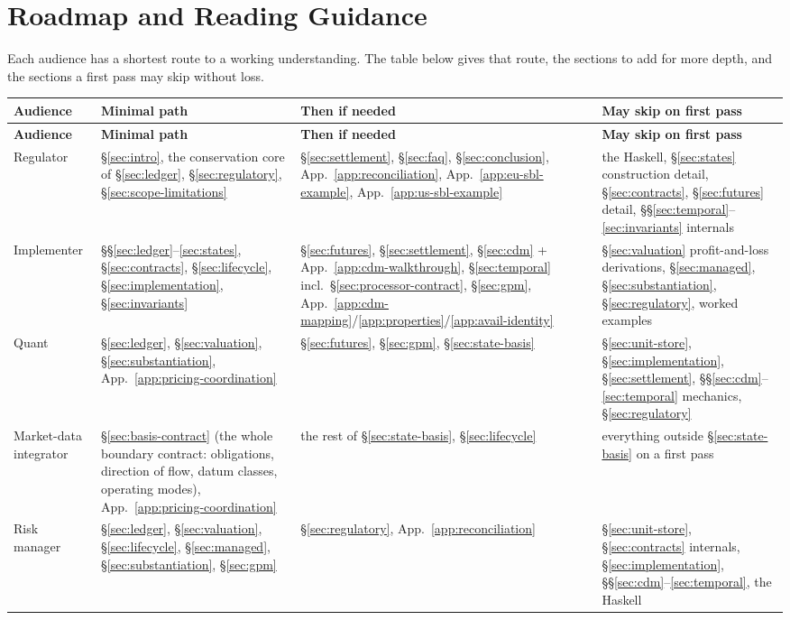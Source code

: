 \section*{Roadmap and Reading Guidance}

Each audience has a shortest route to a working understanding. The table below gives
that route, the sections to add for more depth, and the sections a first pass may skip
without loss.

\begin{longtable}{@{}p{}p{}p{}p{}@{}}
\toprule
\textbf{Audience} & \textbf{Minimal path} & \textbf{Then if needed} & \textbf{May skip on first pass} \\
\midrule
\endfirsthead
\toprule
\textbf{Audience} & \textbf{Minimal path} & \textbf{Then if needed} & \textbf{May skip on first pass} \\
\midrule
\endhead
\bottomrule
\endfoot
Regulator &
\S\ref{sec:intro}, the conservation core of \S\ref{sec:ledger}, \S\ref{sec:regulatory}, \S\ref{sec:scope-limitations} &
\S\ref{sec:settlement}, \S\ref{sec:faq}, \S\ref{sec:conclusion}, App.~\ref{app:reconciliation}, App.~\ref{app:eu-sbl-example}, App.~\ref{app:us-sbl-example} &
the Haskell, \S\ref{sec:states} construction detail, \S\ref{sec:contracts}, \S\ref{sec:futures} detail, \S\S\ref{sec:temporal}--\ref{sec:invariants} internals \\
\addlinespace
Implementer &
\S\S\ref{sec:ledger}--\ref{sec:states}, \S\ref{sec:contracts}, \S\ref{sec:lifecycle}, \S\ref{sec:implementation}, \S\ref{sec:invariants} &
\S\ref{sec:futures}, \S\ref{sec:settlement}, \S\ref{sec:cdm} + App.~\ref{app:cdm-walkthrough}, \S\ref{sec:temporal} incl.\ \S\ref{sec:processor-contract}, \S\ref{sec:gpm}, App.~\ref{app:cdm-mapping}/\ref{app:properties}/\ref{app:avail-identity} &
\S\ref{sec:valuation} profit-and-loss derivations, \S\ref{sec:managed}, \S\ref{sec:substantiation}, \S\ref{sec:regulatory}, worked examples \\
\addlinespace
Quant &
\S\ref{sec:ledger}, \S\ref{sec:valuation}, \S\ref{sec:substantiation}, App.~\ref{app:pricing-coordination} &
\S\ref{sec:futures}, \S\ref{sec:gpm}, \S\ref{sec:state-basis} &
\S\ref{sec:unit-store}, \S\ref{sec:implementation}, \S\ref{sec:settlement}, \S\S\ref{sec:cdm}--\ref{sec:temporal} mechanics, \S\ref{sec:regulatory} \\
\addlinespace
Market-data integrator &
\S\ref{sec:basis-contract} (the whole boundary contract: obligations, direction of flow, datum classes, operating modes), App.~\ref{app:pricing-coordination} &
the rest of \S\ref{sec:state-basis}, \S\ref{sec:lifecycle} &
everything outside \S\ref{sec:state-basis} on a first pass \\
\addlinespace
Risk manager &
\S\ref{sec:ledger}, \S\ref{sec:valuation}, \S\ref{sec:lifecycle}, \S\ref{sec:managed}, \S\ref{sec:substantiation}, \S\ref{sec:gpm} &
\S\ref{sec:regulatory}, App.~\ref{app:reconciliation} &
\S\ref{sec:unit-store}, \S\ref{sec:contracts} internals, \S\ref{sec:implementation}, \S\S\ref{sec:cdm}--\ref{sec:temporal}, the Haskell \\
\bottomrule
\end{longtable}

